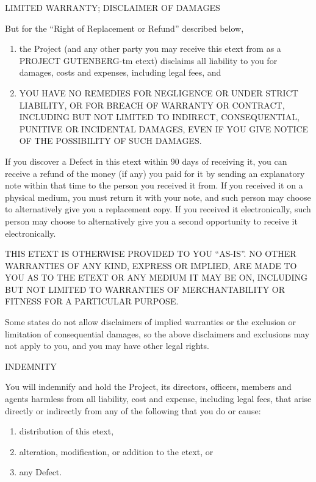 \documentclass[12pt]{book}
\begin{document}
\begin{center}
LIMITED WARRANTY; DISCLAIMER OF DAMAGES
\end{center}

But for the ``Right of Replacement or Refund'' described below,
\begin{enumerate}
\item the Project (and any other party you may receive this
etext from as a PROJECT GUTENBERG-tm etext) disclaims all
liability to you for damages, costs and expenses, including
legal fees, and
\item YOU HAVE NO REMEDIES FOR NEGLIGENCE OR
UNDER STRICT LIABILITY, OR FOR BREACH OF WARRANTY OR CONTRACT,
INCLUDING BUT NOT LIMITED TO INDIRECT, CONSEQUENTIAL, PUNITIVE
OR INCIDENTAL DAMAGES, EVEN IF YOU GIVE NOTICE OF THE
POSSIBILITY OF SUCH DAMAGES.
\end{enumerate}

If you discover a Defect in this etext within 90 days of
receiving it, you can receive a refund of the money (if any)
you paid for it by sending an explanatory note within that
time to the person you received it from.  If you received it
on a physical medium, you must return it with your note, and
such person may choose to alternatively give you a replacement
copy.  If you received it electronically, such person may
choose to alternatively give you a second opportunity to
receive it electronically.

THIS ETEXT IS OTHERWISE PROVIDED TO YOU ``AS-IS''.  NO OTHER
WARRANTIES OF ANY KIND, EXPRESS OR IMPLIED, ARE MADE TO YOU AS
TO THE ETEXT OR ANY MEDIUM IT MAY BE ON, INCLUDING BUT NOT
LIMITED TO WARRANTIES OF MERCHANTABILITY OR FITNESS FOR A
PARTICULAR PURPOSE.

Some states do not allow disclaimers of implied warranties or
the exclusion or limitation of consequential damages, so the
above disclaimers and exclusions may not apply to you, and you
may have other legal rights.

\begin{center}
INDEMNITY
\end{center}

You will indemnify and hold the Project, its directors,
officers, members and agents harmless from all liability, cost
and expense, including legal fees, that arise directly or
indirectly from any of the following that you do or cause:

\begin{enumerate}
\item distribution of this etext,
\item  alteration, modification,
or addition to the etext, or
\item  any Defect.
\end{enumerate}
\end{document}
